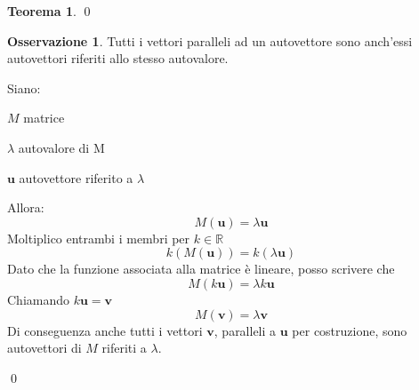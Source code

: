 \documentclass[10pt,a4paper]{article}
\theoremstyle{plain}
\theoremstyle{definition}
\newtheorem{teorema}[subsection]{Teorema}
\newtheorem{osservazione}[subsection]{Osservazione}
\begin{document}
\begin{teorema}
\qed
\end{teorema}
\newpage
\begin{osservazione}
	Tutti i vettori paralleli ad un autovettore sono anch'essi autovettori riferiti allo stesso autovalore.
\end{osservazione}
\proof
	\[\]
	 Siano:
	
	$M$ matrice
	
	$\lambda$ autovalore di M
	
	$\mathbf{u}$ autovettore riferito a $\lambda$
	
	Allora:
	\[
	M(\mathbf{u})=\lambda\mathbf{u}
	\]
	Moltiplico entrambi i membri per $k\in\mathbb{R}$
	\[
	k(M(\mathbf{u}))=k(\lambda\mathbf{u})
	\]
	Dato che la funzione associata alla matrice è lineare, posso scrivere che
	\[
	M(k\mathbf{u})=\lambda k\mathbf{u}
	\]
	Chiamando $k\mathbf{u}=\mathbf{v}$
	\[
	M(\mathbf{v})=\lambda\mathbf{v}
	\]
	Di conseguenza anche tutti i vettori $\mathbf{v}$, paralleli a $\mathbf{u}$ per costruzione, sono autovettori di $M$ riferiti a $\lambda$.
	 
	\qed
\end{document}
